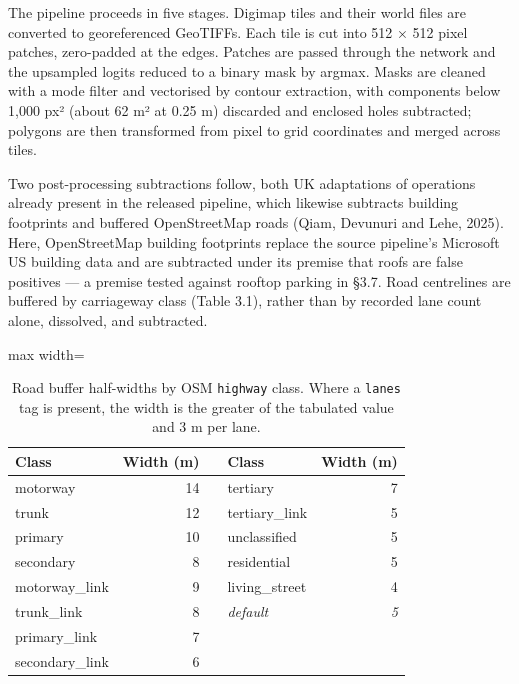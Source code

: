The pipeline proceeds in five stages. Digimap tiles and their world files are converted to georeferenced GeoTIFFs. Each tile is cut into 512 × 512 pixel patches, zero-padded at the edges. Patches are passed through the network and the upsampled logits reduced to a binary mask by argmax. Masks are cleaned with a mode filter and vectorised by contour extraction, with components below 1,000 px² (about 62 m² at 0.25 m) discarded and enclosed holes subtracted; polygons are then transformed from pixel to grid coordinates and merged across tiles.

Two post-processing subtractions follow, both UK adaptations of operations already present in the released pipeline, which likewise subtracts building footprints and buffered OpenStreetMap roads (Qiam, Devunuri and Lehe, 2025). Here, OpenStreetMap building footprints replace the source pipeline's Microsoft US building data and are subtracted under its premise that roofs are false positives --- a premise tested against rooftop parking in §3.7. Road centrelines are buffered by carriageway class (Table 3.1), rather than by recorded lane count alone, dissolved, and subtracted.

\begin{table}[htbp]
\centering
\caption{Road buffer half-widths by OSM \texttt{highway} class. Where a \texttt{lanes} tag is present, the width is the greater of the tabulated value and 3 m per lane.}\label{tab:3.1}
\begin{adjustbox}{max width=\textwidth}
\begin{tabular}{@{}lrllr@{}}
\toprule
Class & Width (m) & & Class & Width (m) \\
\midrule
motorway & 14 & & tertiary & 7 \\
trunk & 12 & & tertiary\_\allowbreak{}link & 5 \\
primary & 10 & & unclassified & 5 \\
secondary & 8 & & residential & 5 \\
motorway\_\allowbreak{}link & 9 & & living\_\allowbreak{}street & 4 \\
trunk\_\allowbreak{}link & 8 & & \emph{default} & \emph{5} \\
primary\_\allowbreak{}link & 7 & & & \\
secondary\_\allowbreak{}link & 6 & & & \\
\bottomrule
\end{tabular}
\end{adjustbox}
\end{table}
\restoreparskip

